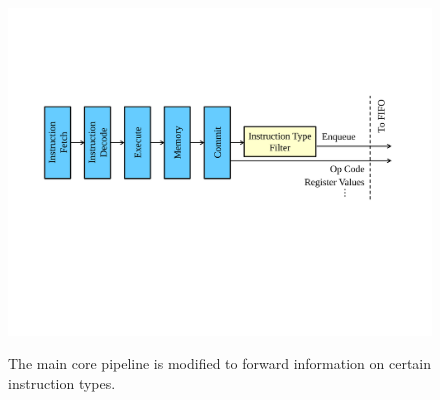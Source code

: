 \begin{figure}
  \begin{center}
    \includegraphics[width=\columnwidth]{figs/monitoring_wcet/monitoring.pdf}
    \caption{The main core pipeline is modified to forward information on certain
    instruction types.}
    \vspace{-0.1in}
    \label{fig:monitoring.main}
    \vspace{-0.0in}
  \end{center}
\end{figure}


